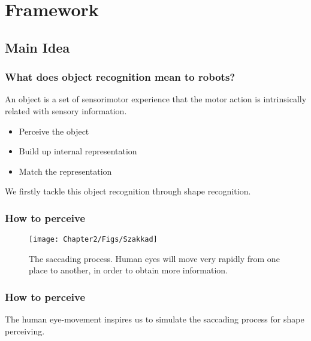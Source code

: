 \documentclass{beamer}
\begin{document}
\section{Framework}

\subsection{Main Idea}

\begin{frame}
\frametitle{What does object recognition mean to robots?}

An object is a set of sensorimotor experience that the motor action is intrinsically related with sensory information.

\end{frame}

\begin{frame}
\begin{itemize}
\item Perceive the object
\item Build up internal representation
\item Match the representation
\end{itemize}

We firstly tackle this object recognition through shape recognition.

\end{frame}


\begin{frame}
\frametitle{How to perceive}

\begin{figure}
\centering    
\texttt{[image: Chapter2/Figs/Szakkad]}
\caption{The saccading process. Human eyes will move very rapidly from one place to another, in order to obtain more information.}
\label{fig:2.4}
\end{figure}%

\end{frame}


\begin{frame}
\frametitle{How to perceive}

The human eye-movement inspires us to simulate the saccading process for shape perceiving. 

\end{frame}
\end{document}

